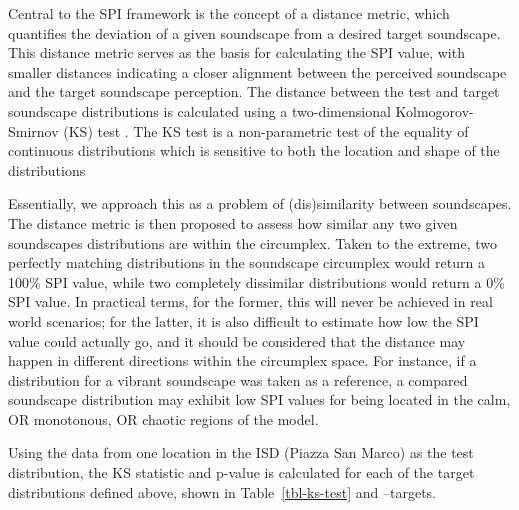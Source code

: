 \documentclass[
  authoryear,
  preprint,
  3p]{elsarticle}
\begin{document}
Central to the SPI framework is the concept of a distance metric, which
quantifies the deviation of a given soundscape from a desired target
soundscape. This distance metric serves as the basis for calculating the
SPI value, with smaller distances indicating a closer alignment between
the perceived soundscape and the target soundscape perception. The
distance between the test and target soundscape distributions is
calculated using a two-dimensional Kolmogorov-Smirnov (KS) test
\citep{Fasano1987multidimensional}. The KS test is a non-parametric test
of the equality of continuous distributions which is sensitive to both
the location and shape of the distributions
\citep{Chakravati1967Handbook}

Essentially, we approach this as a problem of (dis)similarity between
soundscapes. The distance metric is then proposed to assess how similar
any two given soundscapes distributions are within the circumplex. Taken
to the extreme, two perfectly matching distributions in the soundscape
circumplex would return a 100\% SPI value, while two completely
dissimilar distributions would return a 0\% SPI value. In practical
terms, for the former, this will never be achieved in real world
scenarios; for the latter, it is also difficult to estimate how low the
SPI value could actually go, and it should be considered that the
distance may happen in different directions within the circumplex space.
For instance, if a distribution for a vibrant soundscape was taken as a
reference, a compared soundscape distribution may exhibit low SPI values
for being located in the calm, OR monotonous, OR chaotic regions of the
model.

Using the data from one location in the ISD (Piazza San Marco) as the
test distribution, the KS statistic and p-value is calculated for each
of the target distributions defined above, shown in
Table~\ref{tbl-ks-test} and \citet{fig}--targets.
\end{document}
